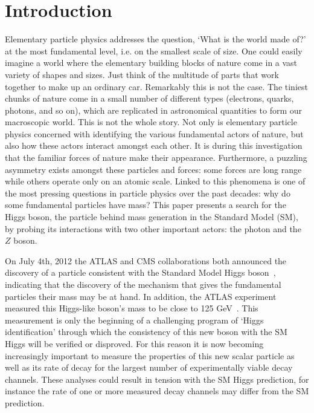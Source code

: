 \section{Introduction} %
Elementary particle physics addresses the question, `What is the world made of?' 
at the most fundamental level, i.e. on the smallest scale of size. 
One could easily imagine a world where the elementary building blocks of 
nature come in a vast variety of shapes and sizes. Just think of the multitude of 
parts that work together to make up an ordinary car. Remarkably this is not
the case. The tiniest chunks of nature come in a small number of different types
(electrons, quarks, photons, and so on), which are replicated in astronomical
quantities to form our macroscopic world. This is not the whole story.
Not only is elementary particle physics concerned with identifying the various 
fundamental actors of nature, but also how these actors interact amongst each other.
It is during this investigation that the familiar forces of nature make their
appearance. 
Furthermore, a puzzling asymmetry exists amongst these particles and forces:
some forces are long range while others operate only on an atomic
scale. Linked to this phenomena is one of the most pressing questions in particle
physics over the past decades: why do some fundamental particles have mass?
This paper presents a search for the Higgs boson, the particle 
behind mass generation in the Standard Model (SM), by probing its interactions with 
two other important actors: the photon and the $Z$ boson.

On July 4th, 2012 the ATLAS and CMS collaborations both announced the 
discovery of a particle consistent with the 
Standard Model Higgs boson~\cite{ATLAS_Higgs,CMS_Higgs}, indicating that
the discovery of the mechanism that gives the fundamental particles their mass
may be at hand. In addition, the ATLAS experiment measured 
this Higgs-like boson's mass to be close to 125 GeV~\cite{ATLAS_Higgs_Dec12}.
This measurement is only the beginning of a challenging program of `Higgs
identification' through which the consistency of this new boson with the SM
Higgs will be verified or disproved. For this reason it is now becoming
increasingly important to measure the properties of this new scalar particle
as well as its rate of decay for the largest number of experimentally
viable decay channels. These analyses could result in tension with the SM
Higgs prediction, for instance the rate of one or more measured decay channels
may differ from the SM prediction. 

